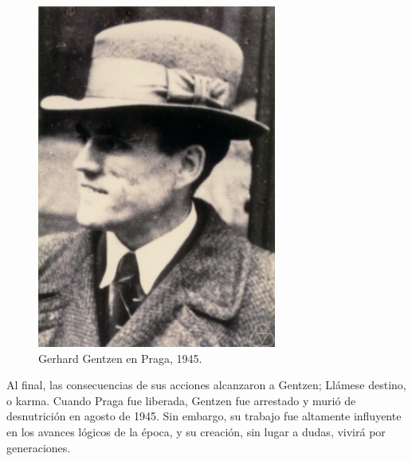 \documentclass[11pt, a4paper]{article}
\begin{document}
\begin{figure}[H]
    \centering
    \includegraphics[width=0.7\textwidth]
    {Gerhard_Gentzen.jpg}
    \caption{Gerhard Gentzen en Praga, 1945.}
    \label{fig:gentzen}
\end{figure}
 

Al final, las consecuencias de sus acciones alcanzaron a Gentzen; Llámese destino, o karma.  Cuando Praga fue liberada, Gentzen fue arrestado y murió de desnutrición en agosto de 1945. 
Sin embargo, su trabajo fue altamente influyente en los avances lógicos de la época, y su creación, sin lugar a dudas, vivirá por generaciones. 
\end{document}
